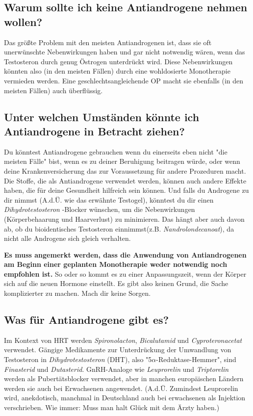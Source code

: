 \documentclass{article}
\begin{document}
\subsection{Warum sollte ich keine Antiandrogene nehmen wollen?}

Das größte Problem mit den meisten Antiandrogenen ist, dass sie oft unerwünschte Nebenwirkungen haben und gar nicht notwendig wären, wenn das Testosteron durch genug Östrogen unterdrückt wird. Diese Nebenwirkungen könnten also (in den meisten Fällen) durch eine wohldosierte Monotherapie vermieden werden. Eine geschlechtsangleichende OP macht sie ebenfalls (in den meisten Fällen) auch überflüssig.

\subsection{Unter welchen Umständen könnte ich Antiandrogene in Betracht ziehen?}

Du könntest Antiandrogene gebrauchen wenn du einerseits eben nicht "die meisten Fälle" bist, wenn es zu deiner Beruhigung beitragen würde, oder wenn deine Krankenversicherung das zur Voraussetzung für andere Prozeduren macht. Die Stoffe, die als Antiandrogene verwendet werden, können auch andere Effekte haben, die für deine Gesundheit hilfreich sein können. Und falls du Androgene zu dir nimmst (A.d.Ü. wie das erwähnte Testogel), könntest du dir einen \textit{Dihydrotestosteron }-Blocker wünschen, um die Nebenwirkungen (Körperbehaarung und Haarverlust) zu minimieren. Das hängt aber auch davon ab, ob du bioidentisches Testosteron einnimmst(z.B. \textit{Nandrolondecanoat}), da nicht alle Androgene sich gleich verhalten.

\textbf{Es muss angemerkt werden, dass die Anwendung von Antiandrogenen am Beginn einer geplanten Monotherapie weder notwendig noch empfohlen ist.} So oder so kommt es zu einer Anpassungszeit, wenn der Körper sich auf die neuen Hormone einstellt. Es gibt also keinen Grund, die Sache komplizierter zu machen. Mach dir keine Sorgen.

\subsection{Was für Antiandrogene gibt es?}

Im Kontext von HRT werden \textit{Spironolacton}, \textit{Bicalutamid} und \textit{Cyproteronacetat} verwendet. Gängige Medikamente zur Unterdrückung der Umwandlung von Testosteron in \textit{Dihydrotestosteron} (DHT), also "5$\alpha$-Reduktase-Hemmer",  sind \textit{Finasterid} und \textit{Dutasterid}. GnRH-Analoge wie \textit{Leuprorelin} und \textit{Triptorelin} werden als Pubertätsblocker verwendet, aber in manchen europäischen Ländern werden sie auch bei Erwachsenen angewendet. (A.d.Ü. Zumindest Leuprorelin wird, anekdotisch, manchmal in Deutschland auch bei erwachsenen als Injektion verschrieben. Wie immer: Muss man halt Glück mit dem Ärzty haben.)
\end{document}
